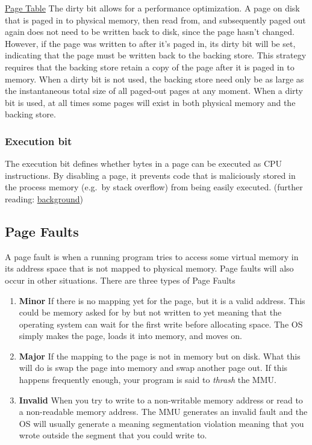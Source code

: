 \href{http://en.wikipedia.org/wiki/Page\_table\#Page\_table\_data}{Page Table} The dirty bit allows for a performance optimization. A page on disk that is paged in to physical memory, then read from, and subsequently paged out again does not need to be written back to disk, since the page hasn't changed. However, if the page was written to after it's paged in, its dirty bit will be set, indicating that the page must be written back to the backing store. This strategy requires that the backing store retain a copy of the page after it is paged in to memory. When a dirty bit is not used, the backing store need only be as large as the instantaneous total size of all paged-out pages at any moment. When a dirty bit is used, at all times some pages will exist in both physical memory and the backing store.

\subsubsection{Execution bit}\label{execution-bit}
The execution bit defines whether bytes in a page can be executed as CPU instructions. By disabling a page, it prevents code that is maliciously stored in the process memory (e.g.~by stack overflow) from being easily executed. (further reading: \href{http://en.wikipedia.org/wiki/NX\_bit\#Hardware\_background}{background})

\subsection{Page Faults}

 A page fault is when a running program tries to access some virtual memory in its address space that is not mapped to physical memory. Page faults will also occur in other situations. There are three types of Page Faults

\begin{enumerate}
 \item \textbf{Minor} If there is no mapping yet for the page, but it is a valid address. This could be memory asked for by  but not written to yet meaning that the operating system can wait for the first write before allocating space. The OS simply makes the page, loads it into memory, and moves on.

 \item \textbf{Major} If the mapping to the page is not in memory but on disk. What this will do is swap the page into memory and swap another page out. If this happens frequently enough, your program is said to \emph{thrash} the MMU.

 \item \textbf{Invalid} When you try to write to a non-writable memory address or read to a non-readable memory address. The MMU generates an invalid fault and the OS will usually generate a  meaning segmentation violation meaning that you wrote outside the segment that you could write to.
\end{enumerate}

